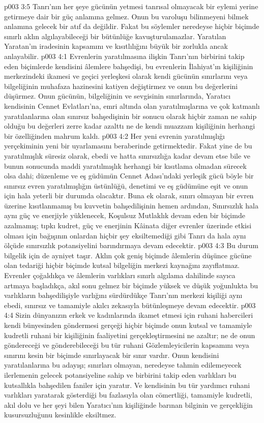 \vs p003 3:5 Tanrı’nın her şeye gücünün yetmesi tanrısal olmayacak bir eylemi yerine getirmeye dair bir güç anlamına gelmez. Onun bu varoluşu bilinmeyeni bilmek anlamına gelecek bir atıf da değildir. Fakat bu söylemler neredeyse hiçbir biçimde sınırlı aklın algılayabileceği bir bütünlüğe kavuşturulamazlar. Yaratılan Yaratan’ın iradesinin kapsamını ve kısıtlılığını büyük bir zorlukla ancak anlayabilir.
\vs p003 4:1 Evrenlerin yaratılmasına ilişkin Tanrı’nın birbirini takip eden biçimlerde kendisini âlemlere bahşedişi, bu evrenlerin İlahiyat’ın kişiliğinin merkezindeki ikamesi ve geçici yerleşkesi olarak kendi gücünün sınırlarını veya bilgeliğinin muhafaza hazinesini katiyen değiştirmez ve onun bu değerlerini düşürmez. Onun gücünün, bilgeliğinin ve sevgisinin sınırlarında, Yaratıcı kendisinin Cennet Evlatları’na, emri altında olan yaratılmışlarına ve çok katmanlı yaratılanlarına olan sınırsız bahşedişinin bir sonucu olarak hiçbir zaman ne sahip olduğu bu değerleri zerre kadar azalttı ne de kendi muazzam kişiliğinin herhangi bir özelliğinden mahrum kaldı.
\vs p003 4:2 Her yeni evrenin yaratılmışlığı yerçekiminin yeni bir uyarlamasını beraberinde getirmektedir. Fakat yine de bu yaratılmışlık süresiz olarak, ebedi ve hatta sınırsızlığa kadar devam etse bile ve bunun sonucunda maddi yaratılmışlık herhangi bir kısıtlama olmadan sürecek olsa dahi; düzenleme ve eş güdümün Cennet Adası’ndaki yerleşik gücü böyle bir sınırsız evren yaratılmışlığın üstünlüğü, denetimi ve eş güdümüne eşit ve onun için hala yeterli bir durumda olacaktır. Buna ek olarak, sınırı olmayan bir evren üzerine kısıtlanmamış bu kuvvetin bahşedilişinin hemen ardından, Sınırsızlık hala aynı güç ve enerjiyle yüklenecek, Koşulsuz Mutlaklık devam eden bir biçimde azalmamış; tıpkı kudret, güç ve enerjinin Kâinata diğer evrenler üzerinde etkisi olması için bağışının onlardan hiçbir şey eksiltemediği gibi Tanrı da hala aynı ölçüde sınırsızlık potansiyelini barındırmaya devam edecektir.
\vs p003 4:3 Bu durum bilgelik için de ayniyet taşır. Aklın çok geniş biçimde âlemlerin düşünce gücüne olan tedariği hiçbir biçimde kutsal bilgeliğin merkezi kaynağını zayıflatmaz. Evrenler çoğaldıkça ve âlemlerin varlıkları sınırlı algılama dahilinde sayıca artmaya başladıkça, akıl sonu gelmez bir biçimde yüksek ve düşük yoğunlukta bu varlıkların bahşedilişiyle varlığını sürdürdükçe Tanrı’nın merkezi kişiliği aynı ebedi, sınırsız ve tamamiyle akılcı zekasıyla bütünleşmeye devam edecektir.
\vs p003 4:4 Sizin dünyanızın erkek ve kadınlarında ikamet etmesi için ruhani habercileri kendi bünyesinden göndermesi gerçeği hiçbir biçimde onun kutsal ve tamamiyle kudretli ruhani bir kişiliğinin faaliyetini gerçekleştirmesini ne azaltır; ne de onun göndereceği ve gönderebileceği bu tür ruhani Gözlemleyicilerin kapsamını veya sınırını kesin bir biçimde sınırlayacak bir sınır vardır. Onun kendisini yaratılanlarına bu adayışı; sınırları olmayan, neredeyse tahmin edilemeyecek ilerlemenin gelecek potansiyeline sahip ve birbirini takip eden varlıkları bu kutsallıkla bahşedilen faniler için yaratır. Ve kendisinin bu tür yardımcı ruhani varlıkları yaratarak gösterdiği bu fazlasıyla olan cömertliği, tamamiyle kudretli, akıl dolu ve her şeyi bilen Yaratıcı’nın kişiliğinde barınan bilginin ve gerçekliğin kusursuzluğunu kesinlikle eksiltmez.
